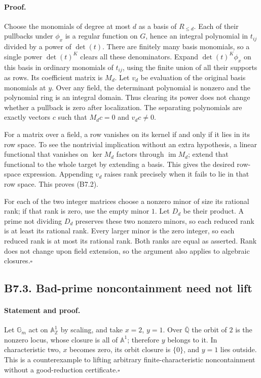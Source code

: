 \paragraph{Proof.}
Choose the monomials of degree at most $d$ as a basis of
$R_{\leq d}$.  Each of their pullbacks under $\phi_x$ is a regular
function on $G$, hence an integral polynomial in $t_{ij}$ divided by
a power of $\det(t)$.  There are finitely many basis monomials, so a
single power $\det(t)^K$ clears all these denominators.  Expand
$\det(t)^K\phi_x$ on this basis in ordinary monomials of $t_{ij}$,
using the finite union of all their supports as rows.  Its coefficient
matrix is $M_d$.  Let $v_d$ be evaluation of the original basis
monomials at $y$.  Over any field, the determinant polynomial is
nonzero and the polynomial ring is an integral domain.  Thus clearing
its power does not change whether a pullback is zero after localization.
The separating polynomials are exactly vectors $c$ such that
$M_dc=0$ and $v_dc\neq0$.

For a matrix over a field, a row vanishes on its kernel if and only if
it lies in its row space.  To see the nontrivial implication without an
extra hypothesis, a linear functional that vanishes on $\ker M_d$
factors through $\operatorname{im}M_d$; extend that functional to the
whole target by extending a basis.  This gives the desired row-space
expression.  Appending $v_d$ raises rank precisely when it fails to lie
in that row space.  This proves (B7.2).

For each of the two integer matrices choose a nonzero minor of size
its rational rank; if that rank is zero, use the empty minor $1$.
Let $D_d$ be their product.  A prime not dividing $D_d$ preserves these
two nonzero minors, so each reduced rank is at least its rational rank.
Every larger minor is the zero integer, so each reduced rank is at most
its rational rank.  Both ranks are equal as asserted.  Rank does not
change upon field extension, so the argument also applies to algebraic
closures.\hfill$\square$

\subsection*{B7.3. Bad-prime noncontainment need not lift}
\paragraph{Statement and proof.}
Let $\mathbb G_m$ act on $\mathbb A^1_{\mathbb Z}$ by scaling,
and take $x=2$, $y=1$.  Over $\overline{\mathbb Q}$ the orbit of $2$
is the nonzero locus, whose closure is all of $\mathbb A^1$; therefore
$y$ belongs to it.  In characteristic two, $x$ becomes zero, its orbit
closure is $\{0\}$, and $y=1$ lies outside.  This is a counterexample
to lifting arbitrary finite-characteristic noncontainment without a
good-reduction certificate.\hfill$\square$

